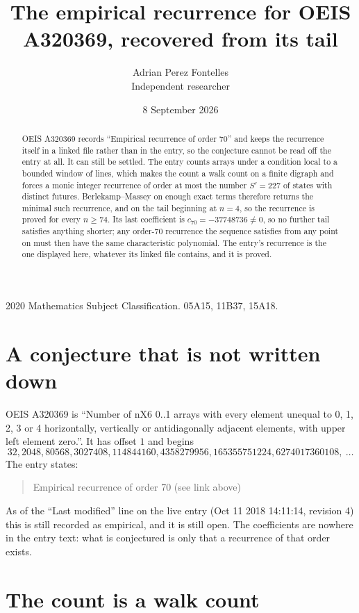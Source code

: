 \documentclass[11pt,a4paper]{article}
\title{The empirical recurrence for OEIS A320369, recovered from its tail}
\author{Adrian Perez Fontelles\\ \small Independent researcher}
\date{8 September 2026}
\theoremstyle{plain}
\theoremstyle{definition}
\begin{document}
\maketitle

\begin{abstract}
OEIS A320369 records ``Empirical recurrence of order $70$'' and keeps the recurrence itself in
a linked file rather than in the entry, so the conjecture cannot be read off the entry at all.
It can still be settled. The entry counts arrays under a condition local to a bounded window of
lines, which makes the count a walk count on a finite digraph and forces a monic integer
recurrence of order at most the number $S'=227$ of states with distinct futures. Berlekamp--Massey on
enough exact terms therefore returns the minimal such recurrence, and on the tail beginning at $n=4$, so the recurrence is proved for every $n\ge74$.
Its last coefficient is $c_{70}=-37748736\neq0$, so no further tail satisfies anything
shorter; any order-$70$ recurrence the sequence satisfies from any point on must then have
the same characteristic polynomial. The entry's recurrence is the one displayed here, whatever
its linked file contains, and it is proved.
\end{abstract}

\noindent\small 2020 Mathematics Subject Classification. 05A15, 11B37, 15A18.\normalsize

\section{A conjecture that is not written down}

OEIS A320369 is ``Number of nX6 0..1 arrays with every element unequal to 0, 1, 2, 3 or 4 horizontally, vertically or antidiagonally adjacent elements, with upper left element zero.''. It has offset $1$ and begins
\[
32, 2048, 80568, 3027408, 114844160, 4358279956, 165355751224, 6274017360108,\ \dots
\]
The entry states:
\begin{quote}
Empirical recurrence of order 70 (see link above)
\end{quote}
As of the ``Last modified'' line on the live entry (Oct 11 2018 14:11:14, revision 4)
this is still recorded as empirical, and it is still open. The coefficients are nowhere in the
entry text: what is conjectured is only that a recurrence of that order exists.

\section{The count is a walk count}
\end{document}

